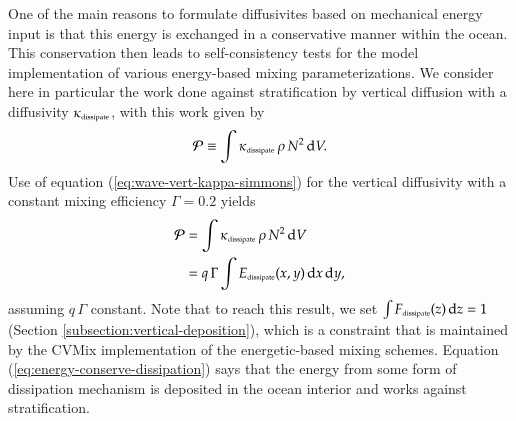 One of the main reasons to formulate diffusivites based on mechanical
energy input is that this energy is exchanged in a conservative manner
within the ocean.  This conservation then leads to self-consistency
tests for the model implementation of various energy-based mixing
parameterizations.  We consider here in particular the work done
against stratification by vertical diffusion with a diffusivity
$\kappa_{\mbox{\tiny dissipate}}$, with this work given by
\begin{equation}
 {\cal P} \equiv  \int \kappa_{\mbox{\tiny dissipate}} \, \rho \, N^{2} \, \mathrm{d}V. 
\end{equation}
Use of equation (\ref{eq:wave-vert-kappa-simmons}) for the vertical
diffusivity with a constant mixing efficiency $\Gamma = 0.2$ yields
\begin{subequations}
\begin{align}
 {\cal P} &=  \int \kappa_{\mbox{\tiny dissipate}} \, \rho \, N^{2} \, \mathrm{d}V
 \\
 &= q \, \Gamma  \int  E_{\mbox{\tiny dissipate}}(x,y) \, \mathrm{d}x \, \mathrm{d}y,
\end{align}
\label{eq:energy-conserve-dissipation}
\end{subequations}
assuming $q \, \Gamma$ constant.  Note that to reach this result, we
set $\int F_{\mbox{\tiny dissipate}}(z) \, \mathrm{d}z = 1$ (Section
\ref{subsection:vertical-deposition}), which is a constraint that is
maintained by the CVMix implementation of the energetic-based mixing
schemes.  Equation (\ref{eq:energy-conserve-dissipation}) says that
the energy from some form of dissipation mechanism is deposited in the
ocean interior and works against stratification.

